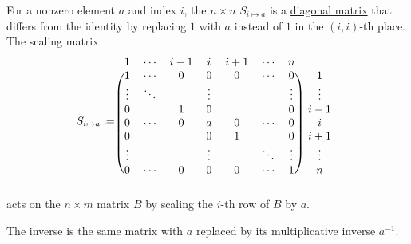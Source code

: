 \begin{definition}
\begin{thmenum}
     For a nonzero element \( a \) and index \( i \), the \( n \times n \)  \( S_{i \mapsto a} \) is a \hyperref[def:matrix_diagonal]{diagonal matrix} that differs from the identity by replacing \( 1 \) with \( a \) instead of \( 1 \) in the \( (i, i) \)-th place. The scaling matrix
    \begin{equation*}
      S_{i \mapsto a}
      \coloneqq
      \begin{blockarray}{cccccccc}
      1      & \cdots & {i-1}   & i      & {i+1}  & \cdots & n      &        \\
      \begin{block}{(ccccccc)c}
      1      & \cdots & 0       & 0      & 0      & \cdots & 0      & 1      \\
      \vdots & \ddots &         & \vdots &        &        & \vdots & \vdots \\
      0      &        & 1       & 0      &        &        & 0      & {i-1}  \\
      0      & \cdots & 0       & a      & 0      & \cdots & 0      & i      \\
      0      &        &         & 0      & 1      &        & 0      & {i+1}  \\
      \vdots &        &         & \vdots &        & \ddots & \vdots & \vdots \\
      0      & \cdots & 0       & 0      & 0      & \cdots & 1      & n      \\
      \end{block}
      \end{blockarray}
    \end{equation*}
    acts on the \( n \times m \) matrix \( B \) by scaling the \( i \)-th row of \( B \) by \( a \).

    The inverse is the same matrix with \( a \) replaced by its multiplicative inverse \( a^{-1} \).


\end{thmenum}
\end{definition}

